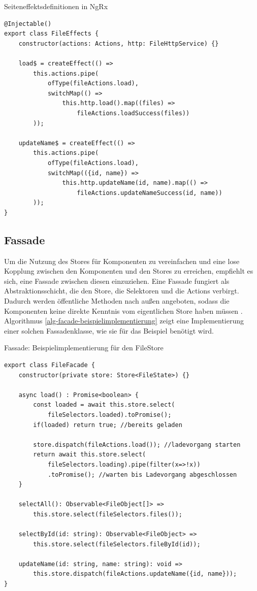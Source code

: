 \documentclass[12pt]{book}          %
\begin{document}
\begin{algorithm}
\caption{Seiteneffektsdefinitionen in NgRx}
\label{alg-seiteneffektsdefinition-in-ng-rx}
\begin{lstlisting}
@Injectable()
export class FileEffects {
    constructor(actions: Actions, http: FileHttpService) {}

    load$ = createEffect(() => 
        this.actions.pipe(
            ofType(fileActions.load),
            switchMap(() => 
                this.http.load().map((files) => 
                    fileActions.loadSuccess(files))
        ));

    updateName$ = createEffect(() => 
        this.actions.pipe(
            ofType(fileActions.load),
            switchMap(({id, name}) => 
                this.http.updateName(id, name).map(() => 
                    fileActions.updateNameSuccess(id, name))
        ));
}
\end{lstlisting}
\end{algorithm}

\subsection{Fassade}
\label{subsec-facade}

Um die Nutzung des Stores für Komponenten zu vereinfachen und eine lose Kopplung zwischen den Komponenten und den Stores zu erreichen, empfiehlt es sich, eine Fassade zwischen diesen einzuziehen. Eine Fassade fungiert als Abstraktionsschicht, die den Store, die Selektoren und die Actions verbirgt. Dadurch werden öffentliche Methoden nach außen angeboten, sodass die Komponenten keine direkte Kenntnis vom eigentlichen Store haben müssen \cite[266]{freeman_entwurfsmuster_2021}. Algorithmus \ref{alg-facade-beispielimplementierung} zeigt eine Implementierung einer solchen Fassadenklasse, wie sie für das Beispiel benötigt wird.

\begin{algorithm}
\caption{Fassade: Beispielimplementierung für den FileStore}
\label{alg-facade-beispielimplementierung}
\begin{lstlisting}
export class FileFacade {
    constructor(private store: Store<FileState>) {}

    async load() : Promise<boolean> {
        const loaded = await this.store.select(
            fileSelectors.loaded).toPromise();
        if(loaded) return true; //bereits geladen
        
        store.dispatch(fileActions.load()); //ladevorgang starten
        return await this.store.select(
            fileSelectors.loading).pipe(filter(x=>!x))
            .toPromise(); //warten bis Ladevorgang abgeschlossen
    }

    selectAll(): Observable<FileObject[]> =>
        this.store.select(fileSelectors.files());
        
    selectById(id: string): Observable<FileObject> =>
        this.store.select(fileSelectors.fileById(id));

    updateName(id: string, name: string): void =>
        this.store.dispatch(fileActions.updateName({id, name}));
}
\end{lstlisting}
\end{algorithm}
\end{document}
